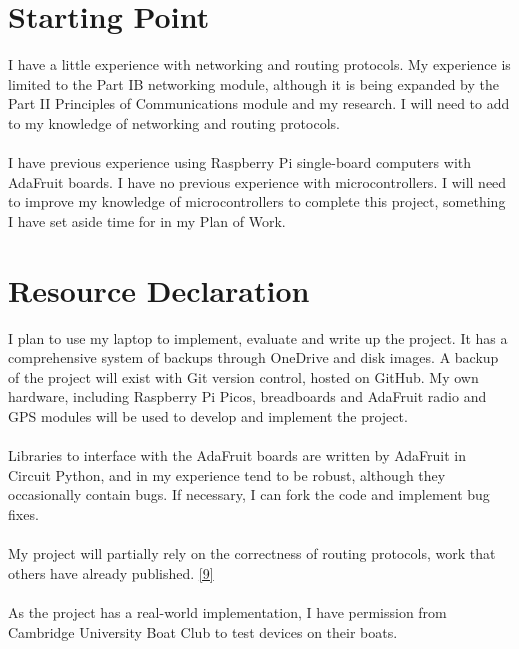 \documentclass[10pt, a4paper]{article}
\begin{document}
\section*{Starting Point} 
I have a little experience with networking and routing protocols. My experience is limited to the Part IB networking module, although it is being expanded by the Part II Principles of Communications module and my research. I will need to add to my knowledge of networking and routing protocols. \\ \\
I have previous experience using Raspberry Pi single-board computers with AdaFruit boards. I have no previous experience with microcontrollers. I will need to improve my knowledge of microcontrollers to complete this project, something I have set aside time for in my Plan of Work.


\section*{Resource Declaration}
I plan to use my laptop to implement, evaluate and write up the project. It has a comprehensive system of backups through OneDrive and disk images. A backup of the project will exist with Git version control, hosted on GitHub. My own hardware, including Raspberry Pi Picos, breadboards and AdaFruit radio and GPS modules will be used to develop and implement the project.\\ \\
Libraries to interface with the AdaFruit boards are written by AdaFruit in Circuit Python, and in my experience tend to be robust, although they occasionally contain bugs. If necessary, I can fork the code and implement bug fixes. \\ \\
My project will partially rely on the correctness of routing protocols, work that others have already published. \hyperref[epidemic]{[9]} \\ \\
As the project has a real-world implementation, I have permission from Cambridge University Boat Club to test devices on their boats.

\vspace{10px}
\end{document}
